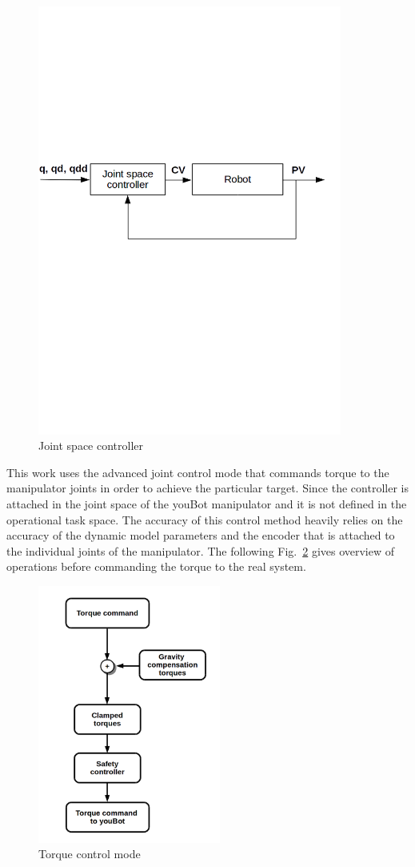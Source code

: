 \begin{figure}[h]
\centering
\includegraphics[width=100mm, trim=0 400 0 300]{pictures/jointspacecontroller}
\caption{Joint space controller}
\label{fig:jointspacecontroller}
\end{figure}

This work uses the advanced joint control mode that commands torque to the manipulator joints in order to achieve the particular target. Since the controller is attached in the joint space of the youBot manipulator and it is not defined in the operational task space. The accuracy of this control method heavily relies on the accuracy of the dynamic model parameters and the encoder that is attached to the individual joints of the manipulator. The following Fig.~\ref{fig:simpletorquemode} gives overview of operations before commanding the torque to the real system.

\begin{figure}[h]
\centering
\includegraphics[width=60mm, trim=0 20 0 20]{pictures/torque_mode}
\caption{Torque control mode}
\label{fig:simpletorquemode}
\end{figure}

